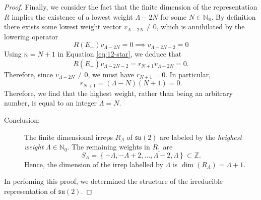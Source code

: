 \begin{proof}
  Finally, we consider the fact that the finite dimension of the representation $R$ implies the existence of a lowest weight $\Lambda - 2N$ for some $N \in \mathbb{N_0}$. By definition there exists some lowest weight vector $v_{\Lambda - 2N} \neq 0$, which is annihilated by the lowering operator
  \begin{equation}
    R(E_-) v_{\Lambda - 2N} = 0 \implies v _{\Lambda - 2N - 2} = 0
  \end{equation}
  Using $n = N + 1$ in Equation \eqref{eq:12-star}, we deduce that
  \begin{equation}
    R(E_+) v_{\Lambda - 2N - 2} = r_{N+1} v_{\Lambda - 2N} = 0.
  \end{equation}
  Therefore, since $v_{\Lambda - 2N} \neq 0$, we must have $r_{N + 1} = 0$. In particular, 
  \begin{equation}
    r_{N + 1} = (\Lambda - N)(N + 1) = 0.
  \end{equation}
  Therefore, we find that the highest weight, rather than being an arbitrary number, is equal to an integer $\Lambda = N$.
  \begin{description}
    \item[Conclusion:] The finite dimensional irreps $R_\Lambda$ of $\mathfrak{su}(2)$ are labeled by the \emph{heighest weight} $\Lambda \in \mathbb{N}_0$. The remaining weights in $R_1$ are
      \begin{equation}
        S_{\Lambda} = \left\{ -\Lambda, -\Lambda + 2, \dots, \Lambda - 2, \Lambda \right\} \subset \mathbb{Z}.
      \end{equation}
      Hence, the dimension of the irrep labelled by $\Lambda$ is $\dim(R_\Lambda) = \Lambda + 1$.
  \end{description}
  In perfoming this proof, we determined the structure of the irreducible representation of $\mathfrak{su}(2)$.
\end{proof}
